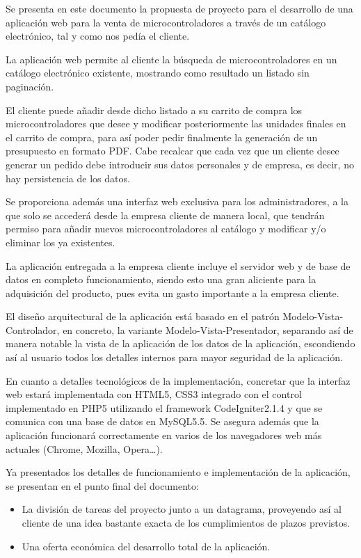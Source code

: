 Se presenta en este documento la propuesta de proyecto  para el desarrollo de una aplicación web para la venta de microcontroladores a través de un catálogo electrónico, tal y como nos pedía el cliente.

La aplicación web permite al cliente la búsqueda de microcontroladores en un catálogo electrónico existente, mostrando como resultado un listado sin paginación. 

El cliente puede añadir desde dicho listado a su carrito de compra los microcontroladores que desee y modificar posteriormente las unidades finales en el carrito de compra, para así poder pedir finalmente la generación de un presupuesto en formato PDF. Cabe recalcar que cada vez que un cliente desee generar un pedido debe introducir sus datos personales y de empresa, es decir, no hay persistencia de los datos.

Se proporciona además una interfaz web exclusiva para los administradores, a la que solo se accederá desde la empresa cliente de manera local, que tendrán permiso para añadir nuevos microcontroladores al catálogo y modificar y/o eliminar los ya existentes.

La aplicación entregada a la empresa cliente incluye el servidor web y de base de datos en completo funcionamiento, siendo esto una gran aliciente para la adquisición del producto, pues evita un gasto importante a la empresa cliente. 

El diseño arquitectural de la aplicación está basado en el patrón Modelo-Vista-Controlador, en concreto, la variante Modelo-Vista-Presentador, separando así de manera notable la vista de la aplicación de los datos de la aplicación, escondiendo así al usuario todos los detalles internos para mayor seguridad de la aplicación.

En cuanto a detalles tecnológicos de la implementación, concretar que la interfaz web estará implementada con HTML5, CSS3 integrado con el control implementado en PHP5 utilizando el framework CodeIgniter2.1.4 y que se comunica con una base de datos en MySQL5.5. Se asegura además que la aplicación funcionará correctamente en varios de los navegadores web más actuales (Chrome, Mozilla, Opera…).

Ya presentados los detalles de funcionamiento e implementación de la aplicación, se presentan en el punto final del documento:

\begin{itemize}
\item La división de tareas del proyecto junto a un datagrama, proveyendo así al cliente de una idea bastante exacta de los cumplimientos de plazos previstos.
\item Una oferta económica del desarrollo total de la aplicación.
\end{itemize}